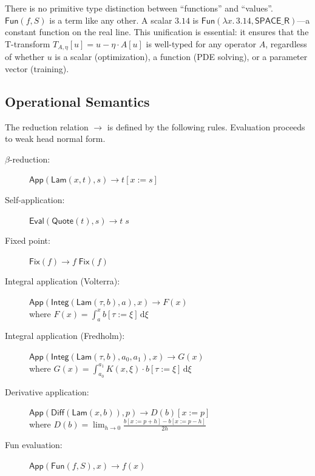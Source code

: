 \documentclass{lmcs}
\theoremstyle{plain}
\theoremstyle{definition}
\newcommand{\Lam}[1]{\lambda #1.\,}
\newcommand{\app}[2]{#1\;#2}
\newcommand{\fix}{\mathsf{Fix}}
\newcommand{\quoteop}{\mathsf{Quote}}
\newcommand{\evalop}{\mathsf{Eval}}
\begin{document}
There is no primitive type distinction between ``functions'' and ``values''.
$\mathsf{Fun}(f, S)$ is a term like any other. A scalar $3.14$ is
$\mathsf{Fun}(\Lam{x} 3.14, \mathsf{SPACE\_R})$---a constant function on the
real line. This unification is essential: it ensures that the T-transform
$T_{A,\eta}[u] = u - \eta \cdot A[u]$ is well-typed for any operator $A$,
regardless of whether $u$ is a scalar (optimization), a function (PDE
solving), or a parameter vector (training).

\subsection{Operational Semantics}

The reduction relation $\to$ is defined by the following rules. Evaluation
proceeds to weak head normal form.

\begin{defi}
\begin{description}
\item[$\beta$-reduction:]
  $\mathsf{App}(\mathsf{Lam}(x, t), s) \to t[x := s]$

\item[Self-application:]
  $\evalop(\quoteop(t), s) \to \app{t}{s}$

\item[Fixed point:]
  $\fix(f) \to \app{f}{\fix(f)}$

\item[Integral application (Volterra):]
  $\mathsf{App}(\mathsf{Integ}(\mathsf{Lam}(\tau, b), a), x)
   \to F(x)$ \\
  where $F(x) = \int_a^x b[\tau := \xi]\,\mathrm{d}\xi$

\item[Integral application (Fredholm):]
  $\mathsf{App}(\mathsf{Integ}(\mathsf{Lam}(\tau, b), a_0, a_1), x)
   \to G(x)$ \\
  where $G(x) = \int_{a_0}^{a_1} K(x, \xi) \cdot b[\tau := \xi]\,
   \mathrm{d}\xi$

\item[Derivative application:]
  $\mathsf{App}(\mathsf{Diff}(\mathsf{Lam}(x, b)), p)
   \to D(b)[x := p]$ \\
  where $D(b) = \lim_{h \to 0} \frac{b[x := p+h] - b[x := p-h]}{2h}$

\item[Fun evaluation:]
  $\mathsf{App}(\mathsf{Fun}(f, S), x) \to f(x)$
\end{description}
\end{defi}
\end{document}

